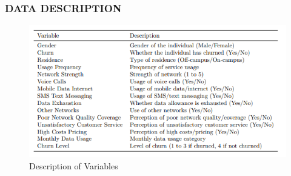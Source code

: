 \documentclass{beamer}
\begin{document}
	\begin{frame}
    \frametitle{DATA DESCRIPTION}
  \begin{figure}
      \centering
      \includegraphics[width=0.75\linewidth]{Presentation/Description of Variables.png}
      \caption{Description of Variables}
      \label{fig:enter-label}
  \end{figure}
  
\end{frame}

 
	
	
\end{document}
